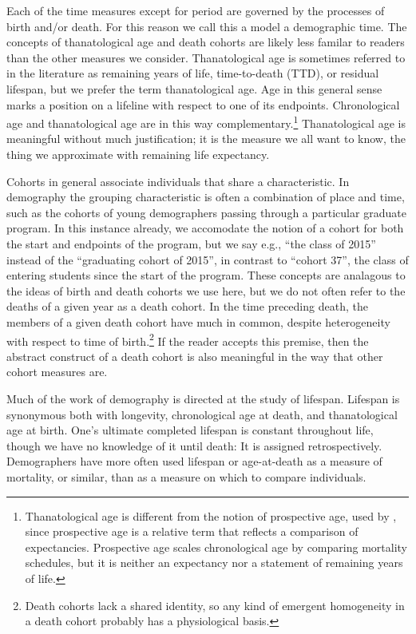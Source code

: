 \documentclass[12pt,oneside,letter]{article} %
\begin{document}
Each of the time measures except for period are governed by the processes of
birth and/or death. For this reason we call this a model a demographic time.
The concepts of thanatological age and death cohorts are likely less familar to
readers than the other measures we consider. Thanatological age is sometimes
referred to in the literature as remaining years of life, time-to-death (TTD),
or residual lifespan, but we prefer the term thanatological age. Age in this
general sense marks a position on a lifeline with respect to one of its
endpoints.
Chronological age and thanatological age are in this way
complementary.\footnote{Thanatological age is different from the notion of
prospective age, used by \citet{sanderson2007new}, since prospective age is a relative term that reflects
a comparison of expectancies. Prospective age scales chronological age by
comparing mortality schedules, but it is neither an expectancy nor a statement
of remaining years of life.} Thanatological age is meaningful without much
justification; it is the measure we all want to know, the thing we approximate
with remaining life expectancy.

Cohorts in general associate individuals that share a characteristic. In
demography the grouping characteristic is often a combination of place and time, such as
the cohorts of young demographers passing through a particular graduate program.
In this instance already, we accomodate the notion of a cohort for both the
start and endpoints of the program, but we say e.g., ``the class of 2015''
instead of the ``graduating cohort of 2015'', in contrast to ``cohort 37'', the
 class of entering students since the start of the program.
These concepts are analagous to the ideas of birth and death cohorts we use
here, but we do not often refer to the deaths of a given year as a death cohort.
In the time preceding death, the members of a given death cohort have much in common, despite
heterogeneity with respect to time of birth.\footnote{Death cohorts lack a
shared identity, so any kind of emergent homogeneity in a death cohort probably
has a physiological basis.} If the reader accepts this premise, then the
abstract construct of a death cohort is also meaningful in the way that other cohort measures are.

Much of the work of demography is directed at the study of lifespan. Lifespan is
synonymous both with longevity, chronological age at death, and thanatological
age at birth. One's ultimate completed lifespan is constant throughout life,
though we have no knowledge of it until death: It is assigned retrospectively.
Demographers have more often used lifespan or age-at-death as a measure of mortality, or similar, than as a measure on which to compare individuals. 
\end{document}
